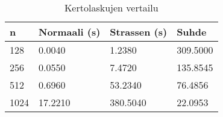 \documentclass[10pt,a4paper,titlepage]{article}
\begin{document}
\begin{table}
\centering
\caption{Kertolaskujen vertailu}
\begin{tabular}{| l | l | l | l |}
  \hline                      
n    &   Normaali (s)  & Strassen (s) & Suhde \\
\hline
128   & 0.0040  & 1.2380   & 309.5000 \\
256   & 0.0550  & 7.4720   & 135.8545 \\
512   & 0.6960  & 53.2340  & 76.4856  \\
1024  & 17.2210 & 380.5040 & 22.0953  \\
\hline
\end{tabular}
\label{tab:strassen}
\end{table}
\end{document}
